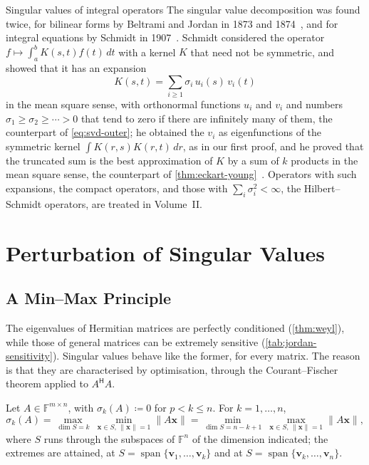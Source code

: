 \begin{note}{Singular values of integral operators}
The singular value decomposition was found twice, for bilinear forms by Beltrami and Jordan in 1873 and 1874~\cite{beltrami1873,jordan1874}, and for integral equations by Schmidt in 1907~\cite{schmidt1907}. Schmidt considered the operator $f\mapsto\int_a^bK(s,t)f(t)\,dt$ with a kernel $K$ that need not be symmetric, and showed that it has an expansion
\[
K(s,t)=\sum_{i\ge1}\sigma_i\,u_i(s)\,v_i(t)
\]
in the mean square sense, with orthonormal functions $u_i$ and $v_i$ and numbers $\sigma_1\ge\sigma_2\ge\cdots>0$ that tend to zero if there are infinitely many of them, the counterpart of \eqref{eq:svd-outer}; he obtained the $v_i$ as eigenfunctions of the symmetric kernel $\int K(r,s)K(r,t)\,dr$, as in our first proof, and he proved that the truncated sum is the best approximation of $K$ by a sum of $k$ products in the mean square sense, the counterpart of \cref{thm:eckart-young}~\cite{stewart1993}. Operators with such expansions, the compact operators, and those with $\sum_i\sigma_i^2<\infty$, the Hilbert--Schmidt operators, are treated in Volume~II.
\end{note}

\section{Perturbation of Singular Values}
\label{sec:svd-perturbation}

\subsection{A Min--Max Principle}

The eigenvalues of Hermitian matrices are perfectly conditioned (\cref{thm:weyl}), while those of general matrices can be extremely sensitive (\cref{tab:jordan-sensitivity}). Singular values behave like the former, for every matrix. The reason is that they are characterised by optimisation, through the Courant--Fischer theorem applied to $A^{\mathsf H}A$.

\begin{theorem}
\label{thm:svd-minmax}
Let $A\in\mathbb F^{m\times n}$, with $\sigma_k(A)\coloneqq0$ for $p<k\le n$. For $k=1,\ldots,n$,
\[
\sigma_k(A)=\max_{\dim S=k}\ \min_{\mathbf x\in S,\,\|\mathbf x\|=1}\|A\mathbf x\|=\min_{\dim S=n-k+1}\ \max_{\mathbf x\in S,\,\|\mathbf x\|=1}\|A\mathbf x\|,
\]
where $S$ runs through the subspaces of $\mathbb F^n$ of the dimension indicated; the extremes are attained, at $S=\operatorname{span}\{\mathbf v_1,\ldots,\mathbf v_k\}$ and at $S=\operatorname{span}\{\mathbf v_k,\ldots,\mathbf v_n\}$.
\end{theorem}

